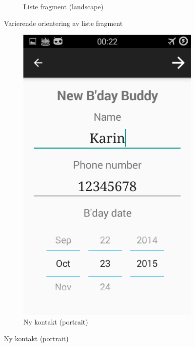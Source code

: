 \begin{figure}[ht]
\begin{subfigure}[b]{0.6\textwidth}
        \caption{Liste fragment (landscape)}
        \label{fig:liste_fragment_l}
    \end{subfigure}
    \caption{Varierende orientering av liste fragment}
    \label{fig:liste_fragment}
\end{figure}


\begin{figure}[ht]
    \centering
    \begin{subfigure}[b]{0.35\textwidth}
        \includegraphics[width=\textwidth]{./img/2.png}
        \caption{Ny kontakt (portrait)}
        \label{fig:ny_kontakt_p}
    \end{subfigure}

\end{figure}
